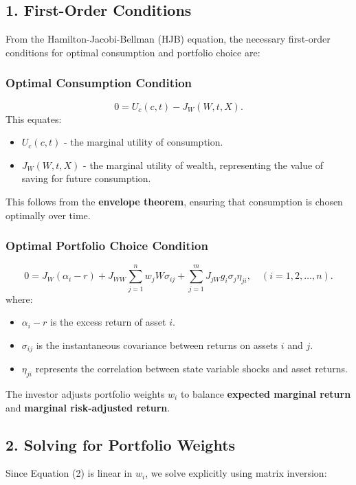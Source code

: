 \documentclass{article}
\begin{document}
\subsection*{1. First-Order Conditions}
From the Hamilton-Jacobi-Bellman (HJB) equation, the necessary first-order conditions for optimal consumption and portfolio choice are:

\subsubsection*{Optimal Consumption Condition}
\begin{equation}
0 = U_c(c, t) - J_W(W, t, X).
\end{equation}
This equates:
\begin{itemize}
    \item \( U_c(c, t) \) - the marginal utility of consumption.
    \item \( J_W(W, t, X) \) - the marginal utility of wealth, representing the value of saving for future consumption.
\end{itemize}
This follows from the \textbf{envelope theorem}, ensuring that consumption is chosen optimally over time.

\subsubsection*{Optimal Portfolio Choice Condition}
\begin{equation}
0 = J_W (\alpha_i - r) + J_{WW} \sum_{j=1}^{n} w_j W \sigma_{ij} + \sum_{j=1}^{m} J_{jW} g_i \sigma_j \eta_{ji}, \quad (i = 1, 2, \dots, n).
\end{equation}
where:
\begin{itemize}
    \item \( \alpha_i - r \) is the excess return of asset \( i \).
    \item \( \sigma_{ij} \) is the instantaneous covariance between returns on assets \( i \) and \( j \).
    \item \( \eta_{ji} \) represents the correlation between state variable shocks and asset returns.
\end{itemize}
The investor adjusts portfolio weights \( w_i \) to balance \textbf{expected marginal return} and \textbf{marginal risk-adjusted return}.

\subsection*{2. Solving for Portfolio Weights}
Since Equation (2) is linear in \( w_i \), we solve explicitly using matrix inversion:
\end{document}
